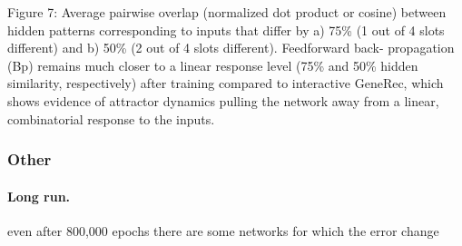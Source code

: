 Figure 7: Average pairwise overlap (normalized dot product or cosine) between hidden patterns corresponding to
inputs that differ by a) 75\% (1 out of 4 slots different) and b) 50\% (2 out of 4 slots different). Feedforward back-
propagation (Bp) remains much closer to a linear response level (75\% and 50\% hidden similarity, respectively) after
training compared to interactive GeneRec, which shows evidence of attractor dynamics pulling the network away from
a linear, combinatorial response to the inputs.

\subsubsection{Other} 

\paragraph{Long run.} 
even after 800,000 epochs there are some networks for which the error change


